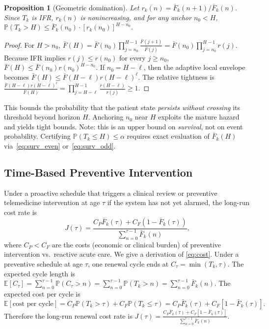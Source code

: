 \documentclass[pdflatex,sn-mathphys-num]{sn-jnl}
\newtheorem{proposition}[theorem]{Proposition}
\theoremstyle{definition}
\newcommand{\Prob}{\mathbb{P}}
\newcommand{\E}{\mathbb{E}}
\numberwithin{equation}{section}
\begin{document}
\begin{proposition}[Geometric domination]\label{prop:geo}
Let $r_k(n)=\bar{F}_k(n{+}1)/\bar{F}_k(n)$. Since $T_k$ is IFR, $r_k(n)$ is nonincreasing, and for any anchor $n_0{<}H$, $\Prob(T_k{>}H)\le\bar{F}_k(n_0)\cdot[r_k(n_0)]^{H-n_0}$.
\end{proposition}

\begin{proof}
For \(H>n_0\),
$\displaystyle \bar F(H)
=
\bar F(n_0)
\prod_{j=n_0}^{H-1}
\frac{\bar F(j+1)}{\bar F(j)}
=
\bar F(n_0)
\prod_{j=n_0}^{H-1}r(j)$.
Because IFR implies \(r(j)\le r(n_0)\) for every \(j\ge n_0\),
$\displaystyle \bar F(H)
\le
\bar F(n_0)r(n_0)^{H-n_0}$.
If \(n_0=H-\ell\), then the adaptive local envelope becomes
$\displaystyle \bar F(H)
\le
\bar F(H-\ell)r(H-\ell)^\ell$.
The relative tightness is
$\displaystyle \frac{
\bar F(H-\ell)r(H-\ell)^\ell
}{
\bar F(H)
}
=
\prod_{j=H-\ell}^{H-1}
\frac{r(H-\ell)}{r(j)}
\ge 1$.
\end{proof}

This bounds the probability that the patient state \emph{persists without crossing} its threshold beyond horizon $H$. Anchoring $n_0$ near $H$ exploits the mature hazard and yields tight bounds. Note: this is an upper bound on \emph{survival}, not on event probability. Certifying $\Prob(T_k\le H)\le\alpha$ requires exact evaluation of $\bar{F}_k(H)$ via~\eqref{eq:surv_even} or~\eqref{eq:surv_odd}.

\subsection{Time-Based Preventive Intervention}\label{sec:repl}

Under a proactive schedule that triggers a clinical review or preventive telemedicine intervention at age $\tau$ if the system has not yet alarmed, the long-run cost rate is
\begin{equation}\label{eq:cost}
J(\tau) = \frac{C_P\bar{F}_k(\tau)+C_F(1{-}\bar{F}_k(\tau))}{\sum_{n=0}^{\tau-1}\bar{F}_k(n)},
\end{equation}
where $C_P<C_F$ are the costs (economic or clinical burden) of preventive intervention vs.\ reactive acute care. 
We give a derivation of \eqref{eq:cost}.
Under a preventive schedule at age \(\tau\), one renewal cycle ends at
$\displaystyle C_\tau=\min(T_k,\tau)$.
The expected cycle length is
$\displaystyle \E[C_\tau]
=
\sum_{n=0}^{\tau-1}\Prob(C_\tau>n)
=
\sum_{n=0}^{\tau-1}\Prob(T_k>n)
=
\sum_{n=0}^{\tau-1}\bar F_k(n)$.
The expected cost per cycle is
\[
\E[\text{cost per cycle}]
=
C_P\Prob(T_k>\tau)
+
C_F\Prob(T_k\le \tau)
=
C_P\bar F_k(\tau)+C_F[1-\bar F_k(\tau)].
\]
Therefore the long-run renewal cost rate is
$\displaystyle J(\tau)
=
\frac{
C_P\bar F_k(\tau)+C_F[1-\bar F_k(\tau)]
}{
\sum_{n=0}^{\tau-1}\bar F_k(n)
}$.
\end{document}
